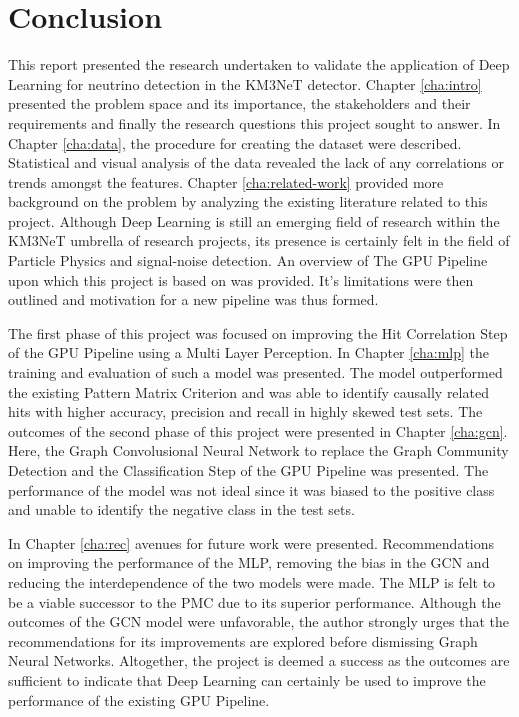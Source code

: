 
\chapter{Conclusion} %

% 

This report presented the research undertaken to validate the
application of Deep Learning for neutrino detection in the KM3NeT
detector. Chapter \ref{cha:intro} presented the problem space and its
importance, the stakeholders and their requirements and finally the
research questions this project sought to answer. In Chapter
\ref{cha:data}, the procedure for creating the dataset were described.
Statistical and visual analysis of the data revealed the lack of any
correlations or trends amongst the features. Chapter
\ref{cha:related-work} provided more background on the problem by
analyzing the existing literature related to this project. Although
Deep Learning is still an emerging field of research within the KM3NeT
umbrella of research projects, its presence is certainly felt in the
field of Particle Physics and signal-noise detection. An overview of
The GPU Pipeline upon which this project is based on was provided.
It's limitations were then outlined and motivation for a new pipeline
was thus formed.

The first phase of this project was focused on improving the Hit
Correlation Step of the GPU Pipeline using a Multi Layer Perception.
In Chapter \ref{cha:mlp} the training and evaluation of such a model
was presented. The model outperformed the existing Pattern Matrix
Criterion and was able to identify causally related hits with higher
accuracy, precision and recall in highly skewed test sets. The
outcomes of the second phase of this project were presented in Chapter
\ref{cha:gcn}. Here, the Graph Convolusional Neural Network to replace
the Graph Community Detection and the Classification Step of the GPU
Pipeline was presented. The performance of the model was not ideal
since it was biased to the positive class and unable to identify the
negative class in the test sets.

In Chapter \ref{cha:rec} avenues for future work were presented.
Recommendations on improving the performance of the MLP, removing the
bias in the GCN and reducing the interdependence of the two models
were made. The MLP is felt to be a viable successor to the PMC due to
its superior performance. Although the outcomes of the GCN model were
unfavorable, the author strongly urges that the recommendations for
its improvements are explored before dismissing Graph Neural Networks.
Altogether, the project is deemed a success as the outcomes are
sufficient to indicate that Deep Learning can certainly be used to
improve the performance of the existing GPU Pipeline.

